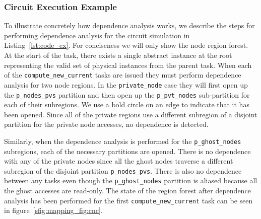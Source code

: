 
\subsubsection{Circuit Execution Example}
\label{subsec:cirdependence}
To illustrate concretely how dependence analysis works, we describe the steps for
performing dependence analysis for the circuit simulation in Listing~\ref{lst:code_ex}.
For conciseness we will only show the node region forest.  At the start of the task, there exists
a single abstract instance at the root representing the valid set of physical
instances from the parent task. 
When each of the {\tt compute\_new\_current} tasks are issued they must perform dependence
analysis for two node regions.  In the {\tt private\_node} case they will first open
up the {\tt p\_nodes\_pvs} partition and then open up the {\tt p\_pvt\_nodes} sub-partition
for each of their subregions.  We use a bold circle on an edge to indicate that it has been
opened.  Since all of the private regions use a different subregion
of a disjoint partition for the private node accesses, no dependence is detected.  

Similarly, when the dependence analysis is performed for the {\tt p\_ghost\_nodes} subregions,
each of the necessary partitions are opened.  There is no dependence with any of the private
nodes since all the ghost nodes traverse a different subregion of the disjoint partition
{\tt p\_nodes\_pvs}.  There is also no dependence between any tasks even though the
{\tt p\_ghost\_nodes} partition is aliased because all the ghost accesses are read-only.
The state of the region forest after dependence analysis has been performed for the first
{\tt compute\_new\_current} task can be seen in figure~\ref{sfig:mapping_fig:cnc}.

